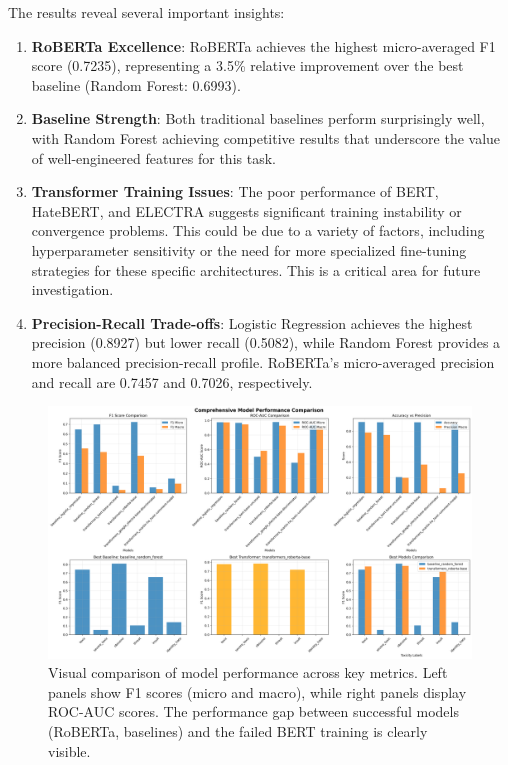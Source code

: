 \documentclass[11pt]{article}
\begin{document}
The results reveal several important insights:

\begin{enumerate}
    \item \textbf{RoBERTa Excellence}: RoBERTa achieves the highest micro-averaged F1 score (0.7235), representing a 3.5\% relative improvement over the best baseline (Random Forest: 0.6993).
    
    \item \textbf{Baseline Strength}: Both traditional baselines perform surprisingly well, with Random Forest achieving competitive results that underscore the value of well-engineered features for this task.
    
    \item \textbf{Transformer Training Issues}: The poor performance of BERT, HateBERT, and ELECTRA suggests significant training instability or convergence problems. This could be due to a variety of factors, including hyperparameter sensitivity or the need for more specialized fine-tuning strategies for these specific architectures. This is a critical area for future investigation.
    
    \item \textbf{Precision-Recall Trade-offs}: Logistic Regression achieves the highest precision (0.8927) but lower recall (0.5082), while Random Forest provides a more balanced precision-recall profile. RoBERTa's micro-averaged precision and recall are 0.7457 and 0.7026, respectively.
\end{enumerate}

\begin{figure}[ht]
    \centering
    \includegraphics[width=\textwidth]{comprehensive_comparison.png}
    \caption{Visual comparison of model performance across key metrics. Left panels show F1 scores (micro and macro), while right panels display ROC-AUC scores. The performance gap between successful models (RoBERTa, baselines) and the failed BERT training is clearly visible.}
    \label{fig:comparison}
\end{figure}
\end{document}
